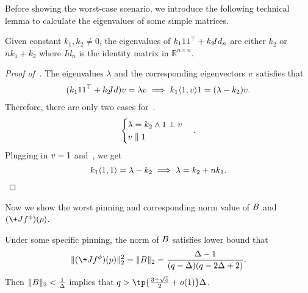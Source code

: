 \documentclass[a4paper,11pt]{article}
\begin{document}
Before showing the worst-case scenario, we introduce the following technical lemma to calculate the eigenvalues of some simple matrices.
\begin{lemma}\label{lem:calc_eigenvalues}
    Given constant $k_1,k_2\neq 0$, 
    the eigenvalues of $k_1\*1\*1^\top +k_2 \!{Id}_n$ are either $k_2$ or $nk_1 + k_2$ where $\!{Id}_n$ is the identity matrix in $\mathbb{R}^{n\times n}$.
\end{lemma}
\begin{proof}[Proof of~]
    The eigenvalues $\lambda$ and the corresponding eigenvectors $\*v$ satisfies that 
    \begin{align}\label{eq:eigen_equation}
        (k_1 \*1\*1^\top + k_2\!{Id})\*v = \lambda \*v
        \implies k_1\langle\*1,\*v\rangle \*1 = (\lambda - k_2)\*v.
    \end{align}
    Therefore, there are only two cases for~.
    $$
    \begin{cases}
        \lambda = k_2 \land \*1\perp \*v
        \\\*v \parallel \*1
    \end{cases}.
    $$
    Plugging in $\*v = \*1$ and~, we get
    \[
        k_1\langle\*1,\*1\rangle = \lambda - k_2 \implies \lambda = k_2 + nk_1.
        \qedhere
    \]
\end{proof}
Now we show the worst pinning and corresponding norm value of $\*B$ and $(\+J f^\phi)(\*p)$.
\begin{theorem}\label{thm:worst_pinning}
    Under some specific pinning, the norm of $\*B$ satisfies lower bound that
    $$
    \|(\+J f^\phi)(\*p)\|_2^2 = \|\*B\|_2 = \frac{\Delta-1}{(q-\Delta)(q-2\Delta+2)}.
    $$
    Then $\|\*B\|_2 < \frac 1\Delta$ implies that $q > \tp{\frac{3+\sqrt 5}{2}+o(1)}\Delta$.
\end{theorem}
\end{document}

